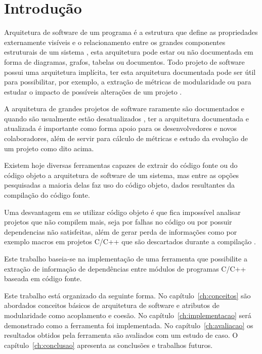 \chapter{Introdução}

Arquitetura de software de um programa é a estrutura que define as propriedades
externamente visíveis e o relacionamento entre os grandes componentes
estruturais de um sistema \cite{engenhariaDeSoftwarePressman}, esta arquitetura
pode estar ou não documentada em forma de diagramas, grafos, tabelas ou documentos.
Todo projeto de software possui uma arquitetura implícita, ter esta arquitetura
documentada pode ser útil para possibilitar, por exemplo, a extração de
métricas de modularidade ou para estudar o impacto de possíveis alterações de
um projeto \cite{mata26-terceiro-projeto-piloto}.

A arquitetura de grandes projetos de software raramente são documentados e
quando são usualmente estão desatualizados
\cite{sourceVersusObjectCodeExtraction}, ter a arquitetura documentada e
atualizada é importante como forma apoio para os desenvolvedores e novos
colaboradores, além de servir para cálculo de métricas e estudo da evolução de
um projeto como dito acima.

Existem hoje diversas ferramentas capazes de extrair do código fonte ou do
código objeto a arquitetura de software de um sistema, mas entre as opções
pesquisadas \cite{sourceVersusObjectCodeExtraction} a maioria delas faz uso do
código objeto, dados resultantes da compilação do código fonte.

Uma desvantagem em se utilizar código objeto é que fica impossível
analisar projetos que não compilem mais, seja por falhas no código ou por
possuir dependencias não satisfeitas, além de gerar perda de informações como por
exemplo macros em projetos C/C++ que são descartados durante a
compilação \cite{sourceVersusObjectCodeExtraction}.

Este trabalho baseia-se na implementação de uma ferramenta que possibilite a
extração de informação de dependências entre módulos de programas C/C++ baseada
em código fonte.

Este trabalho está organizado da seguinte forma. No capítulo~\ref{ch:conceitos}
são abordados conceitos básicos de arquitetura de software e atributos de
modularidade como acoplamento e coesão. No capítulo~\ref{ch:implementacao} será
demonstrado como a ferramenta foi implementada. No capítulo~\ref{ch:avaliacao}
os resultados obtidos pela ferramenta são avaliados com um estudo de caso. O
capítulo~\ref{ch:conclusao} apresenta as conclusões e trabalhos futuros.


